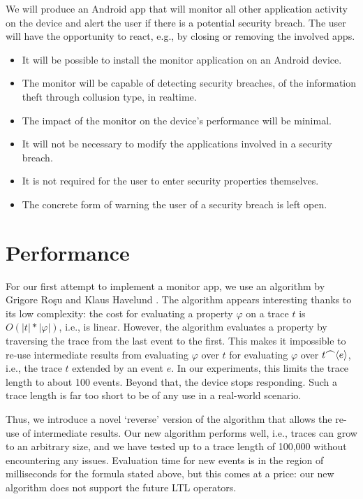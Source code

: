We will produce an Android app that will monitor all other application activity on the device and alert the user if there is a potential security breach.  The user will have the opportunity to react, e.g., by closing or removing the involved apps.

\begin{itemize}
\item It will be possible to install the monitor application on an Android device.
\item The monitor will be capable of detecting security breaches, of the information theft through collusion type, in realtime.
\item The impact of the monitor on the device's performance will be minimal.
\item It will not be necessary to modify the applications involved in a security breach.
\item It is not required for the user to enter security properties themselves.
\item The concrete form of warning the user of a security breach is left open.
\end{itemize}

\section{Performance}

For our first attempt to implement a monitor app, we use an algorithm by Grigore Ro\c{s}u and Klaus Havelund \cite{RosuHavelund}.  The algorithm appears interesting thanks to its low complexity: the cost for evaluating a property $\varphi$ on a trace $t$ is $O(|t| * |\varphi|)$, i.e., is linear.  However, the algorithm evaluates a property by traversing the trace from the last event to the first.  This makes it impossible to re-use intermediate results from evaluating $\varphi$ over $t$ for evaluating $\varphi$ over $t {\mathbin{\raise 0.8ex\hbox{$\frown$}}} \langle e \rangle$, i.e., the trace $t$ extended by an event $e$.  In our experiments, this limits the trace length to about 100 events.  Beyond that, the device stops responding.  Such a trace length is far too short to be of any use in a real-world scenario.

Thus, we introduce a novel `reverse' version of the algorithm that allows the re-use of intermediate results.  Our new algorithm performs well, i.e., traces can grow to an arbitrary size, and we have tested up to a trace length of 100,000 without encountering any issues.  Evaluation time for new events is in the region of milliseconds for the formula stated above, but this comes at a price: our new algorithm does not support the future LTL operators.

